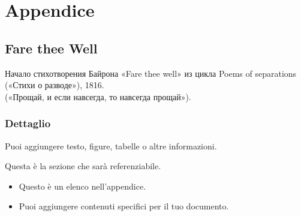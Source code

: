 \appendix %
\chapter{Appendice}


\section{Fare thee Well}
\label{sec:faretheewell} 
Начало сти­хотворения Байрона «Fare thee well» из цикла Poems of separations («Стихи о разводе»), 1816.\\
(«Прощай, и если навсегда, то навсегда прощай»).

\subsection{Dettaglio}
Puoi aggiungere testo, figure, tabelle o altre informazioni.

\label{sec:appendice} %
Questa è la sezione che sarà referenziabile.

\begin{itemize}
    \item Questo è un elenco nell'appendice.
    \item Puoi aggiungere contenuti specifici per il tuo documento.
\end{itemize}
